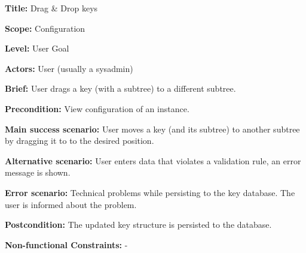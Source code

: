 
\begin{DoxyItemize}
\item {\bfseries Title\+:} Drag \& Drop keys
\item {\bfseries Scope\+:} Configuration
\item {\bfseries Level\+:} User Goal
\item {\bfseries Actors\+:} User (usually a sysadmin)
\item {\bfseries Brief\+:} User drags a key (with a subtree) to a different subtree.
\end{DoxyItemize}


\begin{DoxyItemize}
\item {\bfseries Precondition\+:} View configuration of an instance.
\item {\bfseries Main success scenario\+:} User moves a key (and its subtree) to another subtree by dragging it to to the desired position.
\item {\bfseries Alternative scenario\+:} User enters data that violates a validation rule, an error message is shown.
\item {\bfseries Error scenario\+:} Technical problems while persisting to the key database. The user is informed about the problem.
\item {\bfseries Postcondition\+:} The updated key structure is persisted to the database.
\item {\bfseries Non-\/functional Constraints\+:} -\/ 
\end{DoxyItemize}